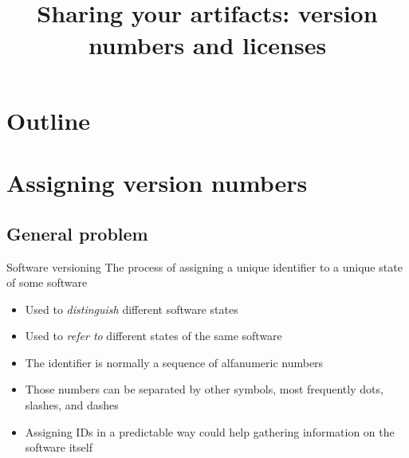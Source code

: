 \documentclass[presentation]{beamer}
\title[03 - Dependency Management]{ \\
\normalsize{Sharing your artifacts: version numbers and licenses}}
\begin{document}

\frame[label=coverpage]{\titlepage}

\section*{Outline}

\frame{\tableofcontents}



\section{Assigning version numbers}

\subsection{General problem}

\begin{frame}{Software versioning}
    The process of assigning a unique identifier to a unique state of some software
    \begin{itemize}
        \item Used to \textit{distinguish} different software states
        \item Used to \textit{refer to} different states of the same software
        \item The identifier is normally a sequence of alfanumeric numbers
        \item Those numbers can be separated by other symbols, most frequently dots, slashes, and dashes
        \item Assigning IDs in a predictable way could help gathering information on the software itself
    \end{itemize}
\end{frame}
\end{document}
